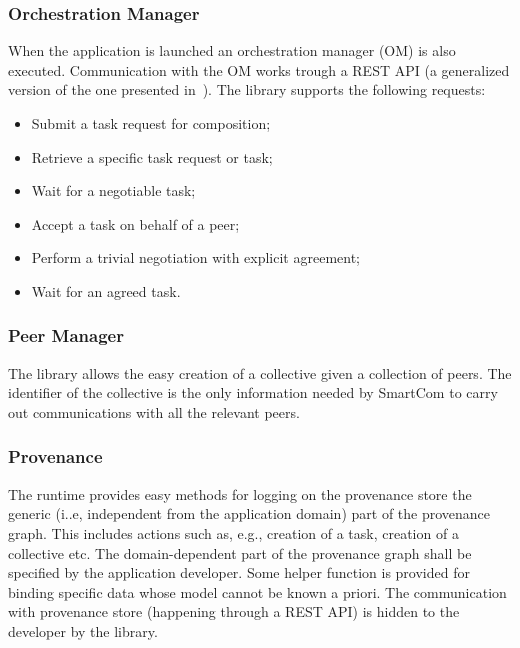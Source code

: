 \subsubsection{Orchestration Manager}
When the application is launched %
an orchestration manager (OM) is also executed. Communication with the OM works trough a REST API (a generalized version of the one presented in~\cite{D6.2}). %
The library supports the %
following requests:
\begin{itemize}
	\item Submit a task request for composition;
	\item Retrieve a specific task request or task;
	\item Wait for a negotiable task;
	\item Accept a task on behalf of a peer;
	\item Perform a trivial negotiation with explicit agreement; 
	\item Wait for an agreed task.
\end{itemize}


\subsubsection{Peer Manager}
The library allows the easy creation of a collective given a collection of peers. The identifier of the collective is the only information needed by SmartCom to carry out communications with all the relevant peers. %

\subsubsection{Provenance}
The runtime provides easy methods for logging on the provenance store the generic (i..e, independent from the application domain) part of the provenance graph. This includes actions such as, e.g., creation of a task, creation of a collective etc. The domain-dependent part of the provenance graph shall be specified by the application developer.%
Some helper function is provided for binding specific data whose model cannot be known a priori.
The communication with provenance store (happening through a REST API) is hidden to the developer by the library.

